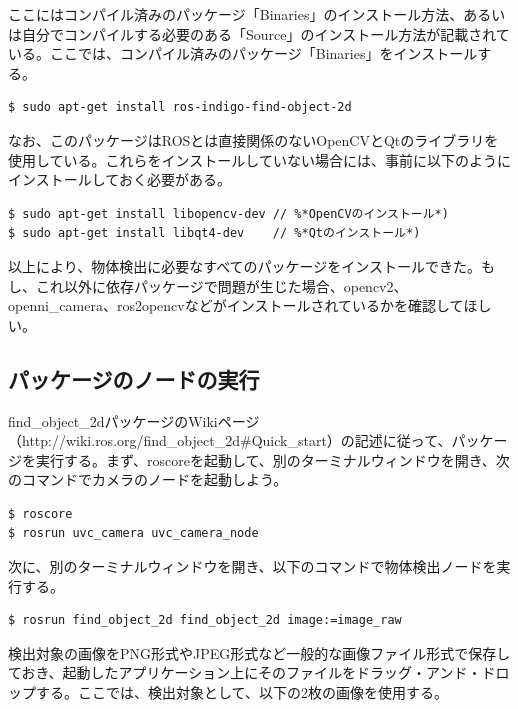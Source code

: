 ここにはコンパイル済みのパッケージ「Binaries」のインストール方法、あるいは自分でコンパイルする必要のある「Source」のインストール方法が記載されている。ここでは、コンパイル済みのパッケージ「Binaries」をインストールする。

\begin{lstlisting}[language=ROS]
$ sudo apt-get install ros-indigo-find-object-2d
\end{lstlisting}

なお、このパッケージはROSとは直接関係のないOpenCVとQtのライブラリを使用している。これらをインストールしていない場合には、事前に以下のようにインストールしておく必要がある。

\begin{lstlisting}[language=ROS]
$ sudo apt-get install libopencv-dev // %*OpenCVのインストール*)
$ sudo apt-get install libqt4-dev    // %*Qtのインストール*)
\end{lstlisting}

以上により、物体検出に必要なすべてのパッケージをインストールできた。もし、これ以外に依存パッケージで問題が生じた場合、opencv2、openni\_camera、ros2opencvなどがインストールされているかを確認してほしい。

\subsection{パッケージのノードの実行}

find\_object\_2dパッケージのWikiページ（http://wiki.ros.org/find\_object\_2d#Quick\_start）の記述に従って、パッケージを実行する。まず、roscoreを起動して、別のターミナルウィンドウを開き、次のコマンドでカメラのノードを起動しよう。

\begin{lstlisting}[language=ROS]
$ roscore
$ rosrun uvc_camera uvc_camera_node
\end{lstlisting}

次に、別のターミナルウィンドウを開き、以下のコマンドで物体検出ノードを実行する。

\begin{lstlisting}[language=ROS]
$ rosrun find_object_2d find_object_2d image:=image_raw
\end{lstlisting}

検出対象の画像をPNG形式やJPEG形式など一般的な画像ファイル形式で保存しておき、起動したアプリケーション上にそのファイルをドラッグ・アンド・ドロップする。ここでは、検出対象として、以下の2枚の画像を使用する。

